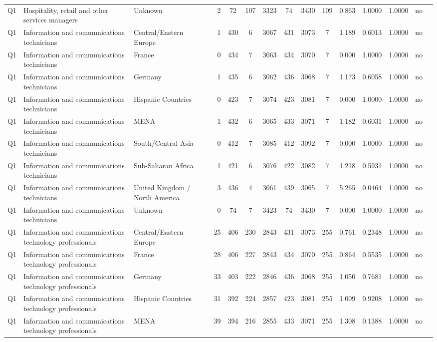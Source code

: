 \begin{longtable}{lllrcccccccccll}
Q1 & Hospitality, retail and other services managers & Unknown & 2 & 72 & 107 & 3323 & 74 & 3430 & 109 & 0.863 & 1.0000 & 1.0000 & no \\
Q1 & Information and communications technicians & Central/Eastern Europe & 1 & 430 & 6 & 3067 & 431 & 3073 & 7 & 1.189 & 0.6013 & 1.0000 & no \\
Q1 & Information and communications technicians & France & 0 & 434 & 7 & 3063 & 434 & 3070 & 7 & 0.000 & 1.0000 & 1.0000 & no \\
Q1 & Information and communications technicians & Germany & 1 & 435 & 6 & 3062 & 436 & 3068 & 7 & 1.173 & 0.6058 & 1.0000 & no \\
Q1 & Information and communications technicians & Hispanic Countries & 0 & 423 & 7 & 3074 & 423 & 3081 & 7 & 0.000 & 1.0000 & 1.0000 & no \\
Q1 & Information and communications technicians & MENA & 1 & 432 & 6 & 3065 & 433 & 3071 & 7 & 1.182 & 0.6031 & 1.0000 & no \\
Q1 & Information and communications technicians & South/Central Asia & 0 & 412 & 7 & 3085 & 412 & 3092 & 7 & 0.000 & 1.0000 & 1.0000 & no \\
Q1 & Information and communications technicians & Sub-Saharan Africa & 1 & 421 & 6 & 3076 & 422 & 3082 & 7 & 1.218 & 0.5931 & 1.0000 & no \\
Q1 & Information and communications technicians & United Kingdom / North America & 3 & 436 & 4 & 3061 & 439 & 3065 & 7 & 5.265 & 0.0464 & 1.0000 & no \\
Q1 & Information and communications technicians & Unknown & 0 & 74 & 7 & 3423 & 74 & 3430 & 7 & 0.000 & 1.0000 & 1.0000 & no \\
Q1 & Information and communications technology professionals & Central/Eastern Europe & 25 & 406 & 230 & 2843 & 431 & 3073 & 255 & 0.761 & 0.2348 & 1.0000 & no \\
Q1 & Information and communications technology professionals & France & 28 & 406 & 227 & 2843 & 434 & 3070 & 255 & 0.864 & 0.5535 & 1.0000 & no \\
Q1 & Information and communications technology professionals & Germany & 33 & 403 & 222 & 2846 & 436 & 3068 & 255 & 1.050 & 0.7681 & 1.0000 & no \\
Q1 & Information and communications technology professionals & Hispanic Countries & 31 & 392 & 224 & 2857 & 423 & 3081 & 255 & 1.009 & 0.9208 & 1.0000 & no \\
Q1 & Information and communications technology professionals & MENA & 39 & 394 & 216 & 2855 & 433 & 3071 & 255 & 1.308 & 0.1388 & 1.0000 & no \\

\end{longtable}
